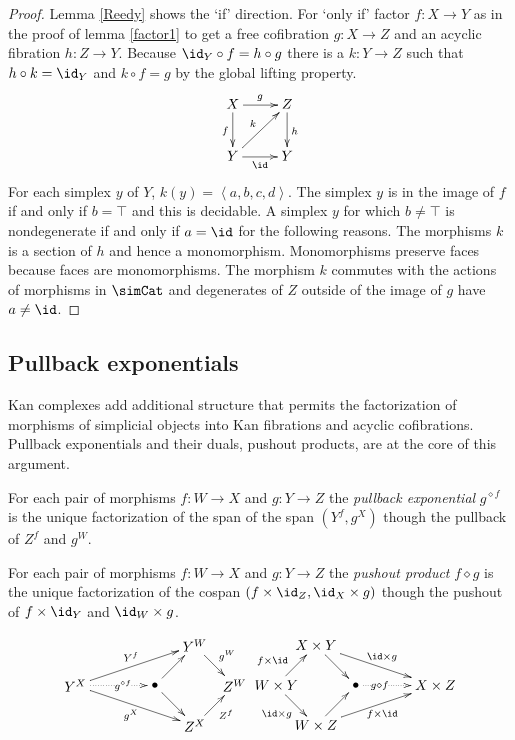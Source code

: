 \documentclass{tac}
\newcommand\hide[1]{}
\newcommand\of{:}
\newcommand\tuplet[1]{\left\langle #1 \right\rangle}
\newcommand\pe[1]{^{\diamond #1}}
\newcommand\pp{\mathbin\diamond}
\begin{document}
\begin{proof} Lemma \ref{Reedy} shows the `if' direction. For `only if' factor $f\of X\to Y$ as in the proof of lemma \ref{factor1} to get a free cofibration $g\of X\to Z$ and an acyclic fibration $h\of Z\to Y$. Because $\id_Y\circ f = h\circ g$ there is a $k\of Y\to Z$ such that $h\circ k = \id_Y$ and $k\circ f = g$ by the global lifting property. 
\[
\xymatrix{
X\ar[d]_f \ar[r]^g & Z\ar[d]^h\\
Y\ar[r]_\id \ar[ur]^k & Y
}
\]
For each simplex $y$ of $Y$, $k(y)=\tuplet{a,b,c,d}$. The simplex $y$ is in the image of $f$ if and only if $b=\top$ and this is decidable. A simplex $y$ for which $b\neq \top$ is nondegenerate if and only if $a=\id$ for the following reasons. The morphisms $k$ is a section of $h$ and hence a monomorphism. Monomorphisms preserve faces because faces are monomorphisms. The morphism $k$ commutes with the actions of morphisms in $\simCat$ and degenerates of $Z$ outside of the image of $g$ have $a\neq\id$.
\end{proof}

\subsection{Pullback exponentials}
Kan complexes add additional structure that permits the factorization of morphisms of simplicial objects into Kan fibrations and acyclic cofibrations. Pullback exponentials and their duals, pushout products, are at the core of this argument.

\begin{definition} For each pair of morphisms $f\of W\to X$ and $g\of Y\to Z$ the \emph{pullback exponential} $g\pe f$ is the unique factorization of the span of the span $(Y^f, g^X)$ though the pullback of $Z^f$ and $g^W$. 
\hide{\[\xymatrix{
Y^X \ar@/^2ex/[rr]^{Y^f} \ar[dr]_{g^X} \ar@{.>}[r]_(.6){g\pe f}
& \bullet \ar[r]\ar[d] & Y^W \ar[d]^{g^W} \\
& Z^X \ar[r]_{Z^f} & Z^W
}\]}

For each pair of morphisms $f\of W\to X$ and $g\of Y\to Z$ the \emph{pushout product} $f\pp g$ is the unique factorization of the cospan $(f\times \id_Z , \id_X\times g)$ though the pushout of $f\times \id_Y$ and $\id_W\times g$. 
\hide{\[\xymatrix{
W\times Y \ar[r]^{f\times \id} \ar[d]_{\id\times g} \po & X\times Y \ar[d] \ar[dr]^{\id\times g} \\
W\times Z \ar[r] \ar@/_2ex/[rr]_{f\times\id} & \bullet \ar[r]^(.4){f\pp g} & X\times Z
}\]}
\[\xy
(0,10)*+{Y^X}="left",(20,10)*+{\bullet}="middle",(30,20)*+{Y^W}="top",(30,0)*+{Z^X}="bottom",(40,10)*+{Z^W}="right"
\ar^{Y^f} "left";"top" \ar_{g^X} "left";"bottom" \ar@{.>}|(.6){g\pe f} "left";"middle" 
\ar "middle";"top" \ar "middle";"bottom" \ar^{g^W} "top";"right" \ar_{Z^f} "bottom";"right"
\endxy\xy
(0,10)*+{W\times Y}="left",(20,10)*+{\bullet}="middle",(10,20)*+{X\times Y}="top",(10,0)*+{W\times Z}="bottom",(40,10)*+{X\times Z}="right"
\ar^(.4){f\times \id} "left";"top" \ar_{\id\times g} "left";"bottom" \ar "top";"middle" \ar "bottom";"middle"
\ar@{.>}|(.3){g\pp f} "middle";"right" \ar^{\id\times g} "top";"right" \ar_{f\times\id} "bottom";"right"
\endxy\]

\end{definition}
\end{document}
